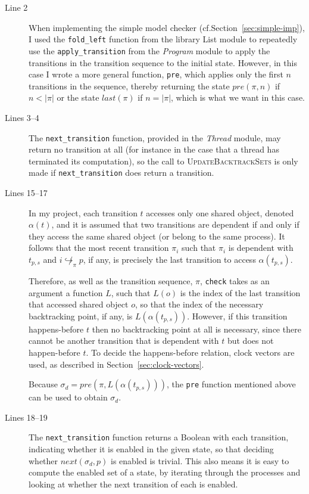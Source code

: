 \documentclass[12pt,a4paper,twoside,openany]{report}
\begin{document}
\begin{description}
	\item[Line 2] When implementing the simple
	model checker (cf.\@ Section~\ref{sec:simple-imp}),
	I used the \texttt{fold\_left}
	function from the library List module to
	repeatedly use the \texttt{apply\_transition}
	from the \textit{Program} module to apply
	the transitions in the transition sequence
	to the initial state. However, in this case
	I wrote a more general function, \texttt{pre},
	which applies only the first
	$n$ transitions in the sequence,
	thereby returning the state
	$\textit{pre}(\pi, n)$ if $n < |\pi|$
	or the state $\textit{last}(\pi)$ if
	$n = |\pi|$, which is what we want in
	this case.

	\item[Lines 3--4] The \texttt{next\_transition}
	function, provided in the \textit{Thread} module,
	may return no transition at all (for instance
	in the case that a thread has terminated its
	computation), so the call to 
	\textsc{UpdateBacktrackSets} is only made if
	\texttt{next\_transition} does return a
	transition.

	\item[Lines 15--17] In my project,
	each transition $t$ accesses only one shared
	object, denoted $\alpha(t)$,
	and it is assumed that two transitions are
	dependent if and only if they access
	the same shared object (or belong to the
	same process). It follows that the most
	recent transition $\pi_i$ such that
	$\pi_i$ is dependent with $t_{p,s}$
	and $i \not\hookrightarrow_\pi p$,
	if any,
	is precisely the last transition
	to access $\alpha(t_{p,s})$.

	Therefore, as well as the transition
	sequence, $\pi$, \texttt{check} takes
	as an argument 
	a function $L$, such that $L(o)$ is the
	index of the last transition that accessed
	shared object $o$, so that the index of the
	necessary backtracking point, if any, is
	$L(\alpha(t_{p,s}))$. However, if
	this transition happens-before
	$t$ then no backtracking point at all
	is necessary, since there cannot be another
	transition that is dependent with $t$
	but does not happen-before $t$. To
	decide the happens-before relation,
	clock vectors are used, as described 
	in Section~\ref{sec:clock-vectors}.

	Because	$\sigma_d = pre(\pi, L(\alpha(t_{p,s})))$,
	the \texttt{pre} function mentioned above can be
	used to obtain $\sigma_d$.

	\item[Lines 18--19]	The \texttt{next\_transition} function
	returns a Boolean with each transition, indicating whether
	it is enabled in the given state, so that deciding whether
	$\textit{next}(\sigma_d,p)$ is enabled is trivial.
	This also
	means it is easy to compute the enabled
	set of a state, by iterating through the processes
	and looking at whether the next transition of each
	is enabled.
	

\end{description}
\end{document}
